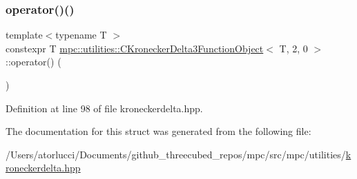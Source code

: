 \subsubsection{\texorpdfstring{operator()()}{operator()()}}
{\footnotesize\ttfamily template$<$typename T $>$ \\
constexpr T \mbox{\hyperlink{structmpc_1_1utilities_1_1_c_kronecker_delta3_function_object}{mpc\+::utilities\+::\+C\+Kronecker\+Delta3\+Function\+Object}}$<$ T, 2, 0 $>$\+::operator() (\begin{DoxyParamCaption}{ }\end{DoxyParamCaption})\hspace{0.3cm}{\ttfamily [inline]}}



Definition at line 98 of file kroneckerdelta.\+hpp.



The documentation for this struct was generated from the following file\+:\begin{DoxyCompactItemize}
\item 
/\+Users/atorlucci/\+Documents/github\+\_\+threecubed\+\_\+repos/mpc/src/mpc/utilities/\mbox{\hyperlink{kroneckerdelta_8hpp}{kroneckerdelta.\+hpp}}\end{DoxyCompactItemize}
